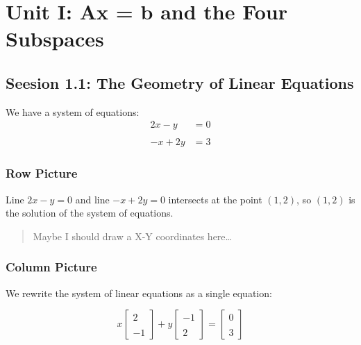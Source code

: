 \documentclass[]{article}
\date{}
\begin{document}
\hypertarget{unit-i-ax-b-and-the-four-subspaces}{%
\section{Unit I: Ax = b and the Four
Subspaces}\label{unit-i-ax-b-and-the-four-subspaces}}

\hypertarget{seesion-1.1-the-geometry-of-linear-equations}{%
\subsection{Seesion 1.1: The Geometry of Linear
Equations}\label{seesion-1.1-the-geometry-of-linear-equations}}

We have a system of equations: \[
\begin{aligned}
2x - y &= 0 \\\\
-x + 2y &= 3
\end{aligned}
\]

\hypertarget{row-picture}{%
\subsubsection{Row Picture}\label{row-picture}}

Line \(2x - y = 0\) and line \(-x + 2y = 0\) intersects at the point
\((1, 2)\), so \((1, 2)\) is the solution of the system of equations.

\begin{quote}
Maybe I should draw a X-Y coordinates here\ldots{}
\end{quote}

\hypertarget{column-picture}{%
\subsubsection{Column Picture}\label{column-picture}}

We rewrite the system of linear equations as a single equation:

\[
x\begin{bmatrix}2 \\\\ -1\end{bmatrix} + y\begin{bmatrix}-1 \\\\ 2\end{bmatrix} = \begin{bmatrix}0 \\\\ 3\end{bmatrix}
\]
\end{document}
